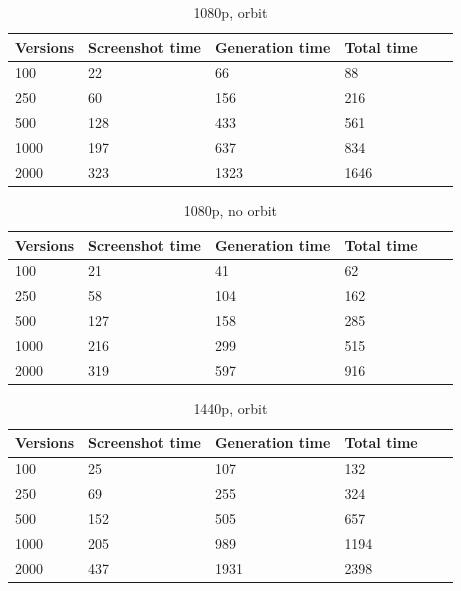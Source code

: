 \documentclass[]{usiinfbachelorproject}
\begin{document}
\begin{table}[H]
    \begin{center}
        \begin{tabular}{ | l | l | l | l | l | l |}
        \hline
        Versions & Screenshot time & Generation time & Total time \\ \hline
        100 & 22 & 66 & 88 \\ \hline
        250 & 60 & 156 & 216\\ \hline
        500 & 128 & 433 & 561\\ \hline
        1000 & 197 & 637 & 834\\ \hline
        2000 & 323 & 1323 & 1646\\ \hline
        \end{tabular}
    \end{center}
    \caption{1080p, orbit}
    \label{tab:performance}
\end{table}

\begin{table}[H]
    \begin{center}
        \begin{tabular}{ | l | l | l | l | l | l |}
        \hline
        Versions & Screenshot time & Generation time & Total time \\ \hline
        100 & 21 & 41 & 62 \\ \hline
        250 & 58 & 104 & 162\\ \hline
        500 & 127 & 158 & 285\\ \hline
        1000 & 216 & 299 & 515\\ \hline
        2000 & 319 & 597 & 916\\ \hline
        \end{tabular}
    \end{center}
    \caption{1080p, no orbit}
    \label{tab:performance}
\end{table}

\begin{table}[H]
    \begin{center}
        \begin{tabular}{ | l | l | l | l | l | l |}
        \hline
        Versions & Screenshot time & Generation time & Total time \\ \hline
        100 & 25 & 107 & 132 \\ \hline
        250 & 69 & 255 & 324\\ \hline
        500 & 152 & 505 & 657\\ \hline
        1000 & 205 & 989 & 1194\\ \hline
        2000 & 437 & 1931 & 2398\\ \hline
        \end{tabular}
    \end{center}
    \caption{1440p, orbit}
    \label{tab:performance}
\end{table}
\end{document}
